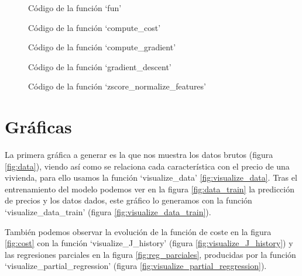 \documentclass[6pt]{AiTex}
\begin{document}
\begin{figure}[H]
    \centering
    
    \caption{Código de la función `fun'}
    \label{fig:fun}
\end{figure}

\begin{figure}[H]
    \centering
    
    \caption{Código de la función `compute\_cost'}
    \label{fig:compute_cost}
\end{figure}

\begin{figure}[H]
    \centering
    
    \caption{Código de la función `compute\_gradient'}
    \label{fig:compute_gradient}
\end{figure}

\begin{figure}[H]
    \centering
    
    \caption{Código de la función `gradient\_descent'}
    \label{fig:gradient_descent}
\end{figure}

\begin{figure}
    \centering
    
    \caption{Código de la función `zscore\_normalize\_features'}
    \label{fig:normalize}
\end{figure}

\section{Gráficas}

La primera gráfica a generar es la que nos muestra los datos brutos (figura \ref{fig:data}), viendo así como se relaciona cada característica con el precio de una vivienda, para ello usamos la función `visualize\_data' \ref{fig:visualize_data}. Tras el entrenamiento del modelo podemos ver en la figura \ref{fig:data_train} la predicción de precios y los datos dados, este gráfico lo generamos con la función `visualize\_data\_train' (figura \ref{fig:visualize_data_train}).

También podemos observar la evolución de la función de coste en la figura \ref{fig:cost} con la función `visualize\_J\_history' (figura \ref{fig:visualize_J_history}) y las regresiones parciales en la figura \ref{fig:reg_parciales}, producidas por la función `visualize\_partial\_regression' (figura \ref{fig:visualize_partial_reggression}).
\end{document}
